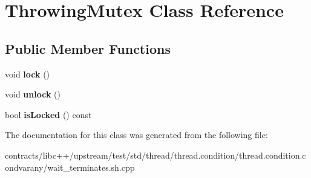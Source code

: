 \hypertarget{class_throwing_mutex}{}\section{Throwing\+Mutex Class Reference}
\label{class_throwing_mutex}
\subsection*{Public Member Functions}
\begin{DoxyCompactItemize}
\item 
\mbox{\label{class_throwing_mutex_af4d246e296357ff98a754e2a00d9de39}} 
void {\bfseries lock} ()
\item 
\mbox{\label{class_throwing_mutex_a4db32be8508345417c9dd46bf9f59273}} 
void {\bfseries unlock} ()
\item 
\mbox{\label{class_throwing_mutex_abec0bf012007680092d36180dfc2b40b}} 
bool {\bfseries is\+Locked} () const
\end{DoxyCompactItemize}


The documentation for this class was generated from the following file\+:\begin{DoxyCompactItemize}
\item 
contracts/libc++/upstream/test/std/thread/thread.\+condition/thread.\+condition.\+condvarany/wait\+\_\+terminates.\+sh.\+cpp\end{DoxyCompactItemize}
